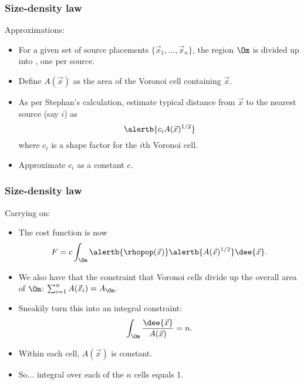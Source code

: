 \begin{frame}
  \frametitle{Size-density law}

  \begin{block}{Approximations:}
    \begin{itemize}
    \item<1-> For a given set of source placements $\{\vec{x}_1,\ldots,\vec{x}_n\}$,
      the region $\Om$ is divided up into 
      ,
      one per source.
    \item<2->
      Define \alert{$A(\vec{x})$} as the \alert{area} of the 
      Voronoi cell containing $\vec{x}$.
    \item<3-> As per Stephan's calculation, estimate
      typical distance from $\vec{x}$ to the nearest source (say $i$)
      as 
      $$
      \alertb{c_i A(\vec{x})^{1/2}}
      $$
      where $c_i$ is a shape factor for the $i$th Voronoi cell.
    \item<4-> 
      Approximate $c_i$ as a constant $c$.
    \end{itemize}
  \end{block}

\end{frame}

\begin{frame}
  \frametitle{Size-density law}

  \begin{block}{Carrying on:}
    \begin{itemize}
    \item<1-> The cost function is now
      $$
      F
      =
      c \int_{\Om}
      \alertb{\rhopop(\vec{x})}
      \alertb{ A(\vec{x})^{1/2}}
      \dee{\vec{x}}.
      $$
    \item<2-> We also have that the \alert{constraint} that
      Voronoi cells divide up the overall area
      of $\Om$:
      $
      \sum_{i=1}^{n} A(\vec{x}_i) = A_\Om.
      $
    \item<3-> Sneakily turn this into an integral constraint:
      $$
      \int_\Om
      \frac{\dee{\vec{x}}}
      {A(\vec{x})}
      = n.
      $$
    \item<4->
      Within each cell, $A(\vec{x})$ is constant.
    \item<5->
      So... integral over each of the $n$ cells equals 1.
    \end{itemize}
  \end{block}

\end{frame}

